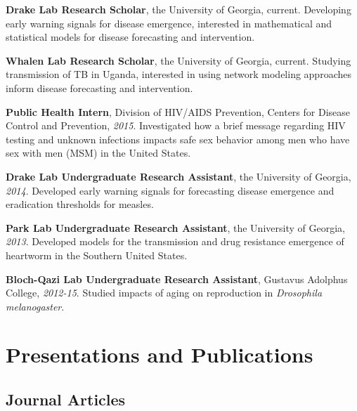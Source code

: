 \documentclass[letterpaper]{article}
\renewenvironment{itemize}{
  \begin{list}{}{
    \setlength{\leftmargin}{1.5em}
  }
}{
  \end{list}
}
\begin{document}
\begin{itemize}
\item \textbf{Drake Lab Research Scholar}, the University of Georgia, current. Developing early warning signals for disease emergence, interested in mathematical and statistical models for disease forecasting and intervention. 
\item \textbf{Whalen Lab Research Scholar}, the University of Georgia, current. Studying transmission of TB in Uganda, interested in using network modeling approaches inform disease forecasting and intervention. 

\item \textbf{Public Health Intern}, Division of HIV/AIDS Prevention, Centers for Disease Control and Prevention, \textit{2015}. Investigated how a brief message regarding HIV testing and unknown infections impacts safe sex behavior among men who have sex with men (MSM) in the United States.
\item \textbf{Drake Lab Undergraduate Research Assistant}, the University of Georgia, \textit{2014}. Developed early warning signals for forecasting disease emergence and eradication thresholds  for measles.
\item \textbf{Park Lab Undergraduate Research Assistant}, the University of Georgia, \textit{2013}. Developed models for the transmission and drug resistance emergence of heartworm in the Southern United States. 
\item \textbf{Bloch-Qazi Lab Undergraduate Research Assistant}, Gustavus Adolphus College, \textit{2012-15}. Studied impacts of aging on reproduction in \textit{Drosophila melanogaster}. 

\end{itemize}

\section*{Presentations and Publications}

\subsection*{Journal Articles}
\end{document}
